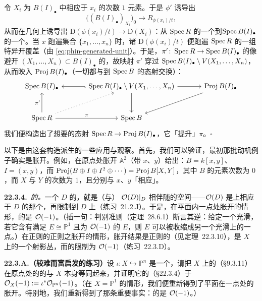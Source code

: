 令 $X_i$ 为 $B(I)_\bullet$ 中相应于 $x_i$ 的次数 $1$ 元素。于是 $\phi'$ 诱导出
\[
\bigl((B(I)_\bullet)_{X_i}\bigr)_0\longrightarrow R_{\phi(x_i)/t},
\]
从而在几何上诱导出 $\mathrm{D}(\phi(x_i)/t)\to\mathrm{D}(X_i)$：从 $\operatorname{Spec} R$ 的一个\trDistinguishedOpen{}到\trAffine\trCone $\operatorname{Spec} B(I)_\bullet$ 的一个\trDistinguishedOpen。当 $x$ 跑遍集合 $\{x_1,\dots,x_n\}$ 时，诸 $\mathrm{D}(\phi(x_i)/t)$ 便跑遍 $\operatorname{Spec} R$ 的一组特异开覆盖（由 \eqref{eq:phin-generated-unit}）。于是，$\pi'\colon\operatorname{Spec} R\to\operatorname{Spec} B(I)_\bullet$ 的像避开\trIrrelevantIdeal{} $(X_1,\dots,X_n)\subset B(I)_\bullet$ 的\trVanishingSet，故映射 $\pi'$ 穿过 $\operatorname{Spec} B(I)_\bullet\setminus V(X_1,\dots,X_n)$，从而映入 $\operatorname{Proj} B(I)_\bullet$（一切都与到 $\operatorname{Spec} B$ 的态射交换）：
\[
\begin{tikzcd}[row sep=2.8em, column sep=3.4em]
\Spec B(I)_\bullet & \Spec B(I)_\bullet\setminus V(X_1,\dots,X_n) \ar[l,hook] \ar[r] \ar[d] & \Proj B(I)_\bullet \ar[dl] \\
\Spec R \ar[u,"\pi'"] \ar[ur,dotted] \ar[r,"\pi"] & \Spec B &
\end{tikzcd}
\]
我们便构造出了想要的态射 $\operatorname{Spec} R\to\operatorname{Proj} B(I)_\bullet$，它「提升」$\pi$。\hfill$\square$

以下是由这套\trBlowup{}构造派生的一些应用与观察。首先，我们可以验证，最初那批动机例子确实是胀开。例如，在原点处胀开 $\mathbb{A}^2$（带\trCoordinate{} $x$、$y$）给出：$B=k[x,y]$、$I=(x,y)$，而 $\operatorname{Proj}(B\oplus I\oplus I^2\oplus\cdots)=\operatorname{Proj} B[X,Y]$，其中 $B$ 的元素次数为 $0$，而 $X$ 与 $Y$ 的次数为 $1$，且分别与 $x$、$y$「相应」。

\textbf{22.3.4.}\ \emph{\trExceptionalDivisor{}的\trNormalBundle。}\quad 一个\trEffectiveCartierDivisor{} $D$ 的\trNormalBundle，就是（与）\trInvertibleSheaf{} $\mathcal{O}(D)|_D$ 相伴随的空间——$\mathcal{O}(D)$ 是\trTotalSpace{}上相应于 $D$ 的那个\trInvertibleSheaf，再限制到 $D$ 上（\mbox{练习~21.2.J}）。于是，在平面内一点处胀开的情形，\trExceptionalDivisor{}的\trNormalBundle{}是 $\mathcal{O}(-1)$。（插一句：\trCastelnuovo{}判别准则（\mbox{定理~28.6.1}）断言其逆：给定一个光滑\trSurface，若它含有满足 $E\cong\mathbb{P}^1$ 且\trNormalBundle{}为 $\mathcal{O}(-1)$ 的 $E$，则 $E$ 可以被收缩成另一个光滑\trSurface{}上的一点。）在正则\trVariety{}的正则\trSubvariety{}之胀开的情形，胀开结果是正则的（见\mbox{定理~22.3.10}），\trExceptionalDivisor{}是 $X$ 上的一个射影丛，而\trExceptionalDivisor{}的\trNormalBundle{}限制为 $\mathcal{O}(-1)$（\mbox{练习~22.3.D}）。

\textbf{22.3.A.（较难而富启发的练习）}\quad 设 $\iota\colon X\hookrightarrow\mathbb{P}^n$ 是一个\trProjective\trScheme，请把 $X$ 上的\trAffine\trCone（\S9.3.11）在原点处的\trBlowup{}的\trExceptionalDivisor{}与 $X$ 本身等同起来，并证明它的\trNormalBundle（\S22.3.4）\trIsomorphic{}于 $\mathcal{O}_X(-1):=\iota^*\mathcal{O}_{\mathbb{P}^n}(-1)$。（在 $X=\mathbb{P}^1$ 的情形，我们便重新得到了平面在一点处的胀开。特别地，我们重新得到了那条重要事实：\trExceptionalDivisor{}的\trNormalBundle{}是 $\mathcal{O}(-1)$。）

